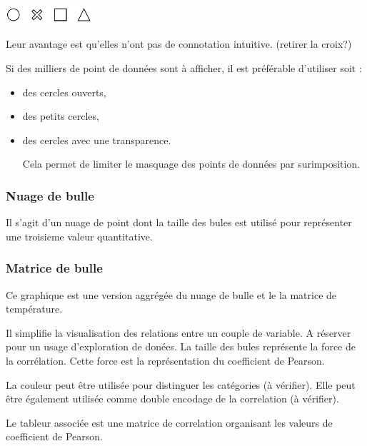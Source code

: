 \documentclass[a4paper,12pt]{article}
\begin{document}
\begin{multicols}{2}
\begin{center}
\includegraphics[width=3.2cm]{./img/formes.pdf}
\end{center}

Leur avantage est qu'elles n'ont pas de connotation intuitive.\autocite{andreaskrauseBestPracticesData2024} (retirer la croix?)

Si des milliers de point de données sont à afficher, il est préférable d'utiliser soit :
\begin{itemize}
\item des cercles ouverts,
\item des petits cercles,\autocite{stephenfewComponentlevelGraphDesign2012}
\item des cercles avec une transparence.\autocite{stephenfewComponentlevelGraphDesign2012}

Cela permet de limiter le masquage des points de données par surimposition. \autocite{andreaskrauseBestPracticesData2024}
\end{itemize}
\subsubsection{Nuage de bulle}
\label{sec:orga970076}
Il s'agit d'un nuage de point dont la taille des bules est utilisé pour représenter une troisieme valeur quantitative. \autocite{alansmithLexiqueVisuel}
\subsubsection{Matrice de bulle}
\label{sec:org447f527}
Ce graphique est une version aggrégée du nuage de bulle et le la matrice de température.

Il simplifie la visualisation des relations entre un couple de variable. A réserver pour un usage d'exploration de donées. \autocite{sosulskiGraphics2019} La taille des bules représente la force de la corrélation. Cette force est la représentation du coefficient de Pearson. \autocite{jonathanschwabishRelationship2021}

La couleur peut être utilisée pour distinguer les catégories (à vérifier). Elle peut être également utilisée comme double encodage de la correlation (à vérifier).

Le tableur associée est une matrice de correlation organisant les valeurs de coefficient de Pearson.

\end{multicols}
\end{document}
